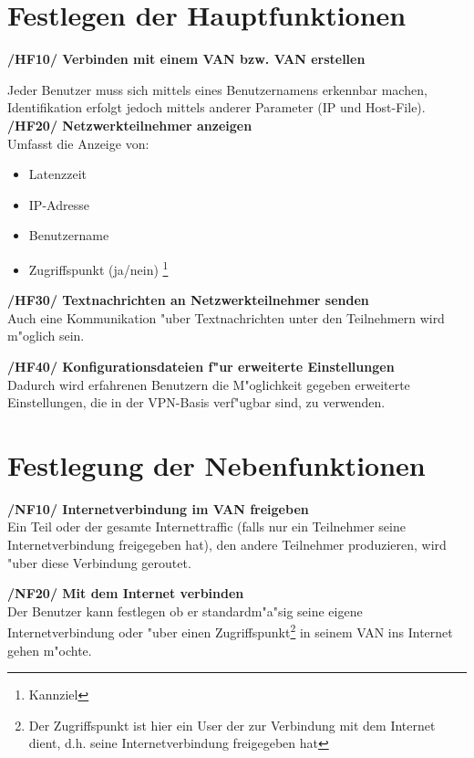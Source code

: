 \documentclass[a4paper,12pt]{scrreprt}
\begin{document}
	\section{Festlegen der Hauptfunktionen}
		\textbf{/HF10/ Verbinden mit einem VAN bzw. VAN erstellen}
		
		Jeder Benutzer muss sich mittels eines Benutzernamens erkennbar machen, Identifikation erfolgt jedoch mittels anderer Parameter (IP und Host-File). \\
		
		
		\textbf {/HF20/ Netzwerkteilnehmer anzeigen
		}\\
		Umfasst die Anzeige von:
		
		\begin{itemize}
		\item Latenzzeit
		\item IP-Adresse
		\item Benutzername
		\item Zugriffspunkt (ja/nein) \footnote{Kannziel}\\
		\end{itemize}
		
		
		
		
		
		\textbf {/HF30/ Textnachrichten an Netzwerkteilnehmer senden}
		\\Auch eine Kommunikation "uber Textnachrichten unter den Teilnehmern wird m"oglich sein.
		
		 \textbf {/HF40/ Konfigurationsdateien f"ur erweiterte Einstellungen}
		\\Dadurch wird erfahrenen Benutzern die M"oglichkeit gegeben erweiterte Einstellungen, die in der VPN-Basis verf"ugbar sind, zu verwenden.
		
	\section{Festlegung der Nebenfunktionen}
	\textbf { /NF10/ Internetverbindung im VAN freigeben} 
	\\Ein Teil oder der gesamte Internettraffic (falls nur ein Teilnehmer seine Internetverbindung freigegeben hat), den andere Teilnehmer produzieren, wird "uber diese Verbindung geroutet.
			
	\textbf {/NF20/ Mit dem Internet verbinden} 
	\\Der Benutzer kann festlegen ob er standardm"a"sig seine eigene Internetverbindung oder "uber einen Zugriffspunkt\footnote{Der Zugriffspunkt ist hier ein User der zur Verbindung mit dem Internet dient, d.h. seine Internetverbindung freigegeben hat} in seinem VAN ins Internet gehen m"ochte.
	
\end{document}
